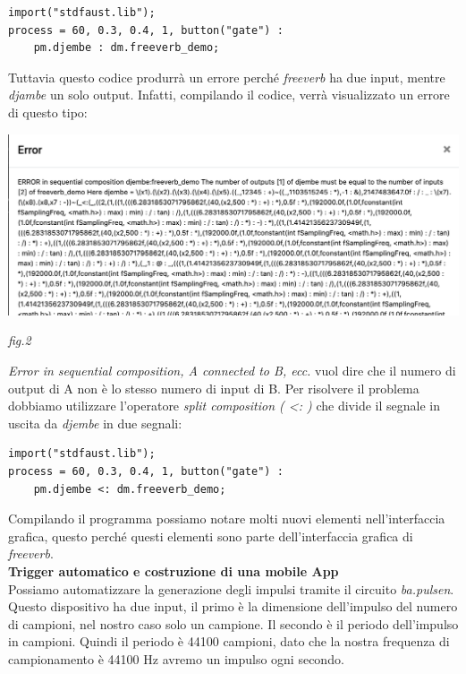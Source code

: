 \documentclass[11pt]{article}
\begin{document}
\begin{multicols*}{2}
\begin{Verbatim}[fontsize=\footnotesize]
import("stdfaust.lib");
process = 60, 0.3, 0.4, 1, button("gate") : 
    pm.djembe : dm.freeverb_demo;
\end{Verbatim}

Tuttavia questo codice produrrà un errore perché \textit{freeverb} ha due input, mentre \textit{djambe} un solo output. Infatti, compilando il codice, verrà visualizzato un errore di questo tipo:

\begin{center}
\includegraphics[scale=0.25]{img/02.png}

{\scriptsize \emph{fig.2 }}
\end{center}

\textit{Error in sequential composition, A connected to B, ecc.} vuol dire che il numero di output di A non è lo stesso numero di input di B. Per risolvere il problema dobbiamo utilizzare l'operatore \textit{split composition ( <: )} che divide il segnale in uscita da \textit{djembe} in due segnali:

\begin{Verbatim}[fontsize=\footnotesize]
import("stdfaust.lib");
process = 60, 0.3, 0.4, 1, button("gate") : 
    pm.djembe <: dm.freeverb_demo;
\end{Verbatim}

Compilando il programma possiamo notare molti nuovi elementi nell'interfaccia grafica, questo perché questi elementi sono parte dell'interfaccia grafica di \textit{freeverb}.\\

\textbf{Trigger automatico e costruzione di una mobile App}\\

Possiamo automatizzare la generazione degli impulsi tramite il circuito \textit{ba.pulsen}. Questo dispositivo ha due input, il primo è la dimensione dell'impulso del numero di campioni, nel nostro caso solo un campione. Il secondo è il periodo dell'impulso in campioni. Quindi il periodo è 44100 campioni, dato che la nostra frequenza di campionamento è 44100 Hz avremo un impulso ogni secondo. 


\end{multicols*}
\end{document}
